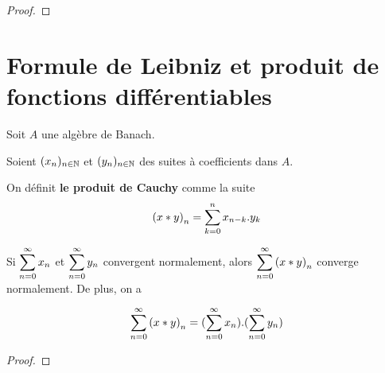 \ifdefined\outputproof
\begin{proof}

\end{proof}
\fi

\section{Formule de Leibniz et produit de fonctions différentiables}

\begin{definition} [Algèbre]

\end{definition}

\begin{definition} 

\end{definition}

\begin{definition} 

\end{definition}

\begin{definition} 

\end{definition}

\begin{definition}
	Soit $A$ une algèbre de Banach.

	Soient $(x_{n})_{n \in \mathbb{N}}$ et $(y_{n})_{n \in \mathbb{N}}$ des
	suites à coefficients dans $A$.

	On définit \textbf{le produit de Cauchy} comme la suite
	\begin{equation*}
		{(x \ast y)}_{n} =
		\displaystyle \sum_{k = 0}^{n} x_{n - k} . y_{k}
	\end{equation*}
\end{definition}

\begin{theorem}
	\label{theorem_cauchy_mertens}
	Si $\displaystyle \sum_{n = 0}^{\infty} x_{n}$ et $\displaystyle \sum_{n = 0}^{\infty} y_{n}$ convergent
	normalement, alors $\displaystyle \sum_{n = 0}^{\infty} {(x \ast y)}_{n}$ converge normalement.
	De plus, on a

	\begin{equation*}
		\displaystyle \sum_{n = 0}^{\infty} {(x \ast y)}_{n} =
		(\displaystyle \sum_{n = 0}^{\infty} x_{n}) . (\displaystyle \sum_{n = 0}^{\infty} y_{n})
	\end{equation*}
\end{theorem}

\ifdefined\outputproof
\begin{proof}

\end{proof}
\fi

